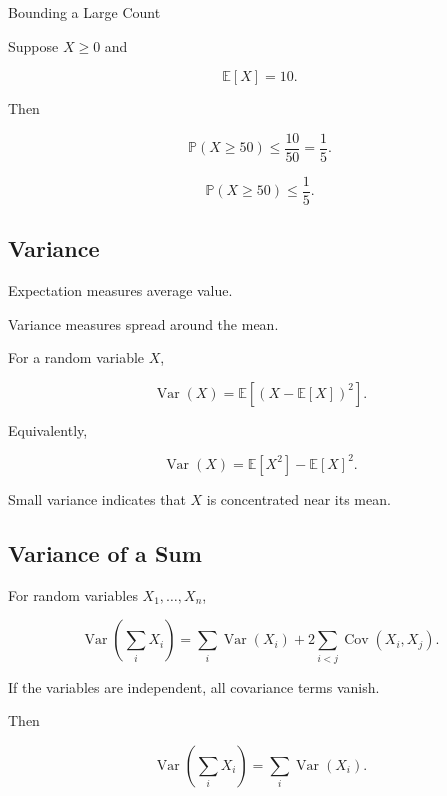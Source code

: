 \begin{workedexamplebox}{Bounding a Large Count}

Suppose \(X\geq0\) and

\[
\mathbb{E}[X]=10.
\]

Then

\[
\mathbb{P}(X\geq50)
\leq
\frac{10}{50}
=
\frac15.
\]

\begin{answerbox}
\[
\boxed{
\mathbb{P}(X\geq50)\leq\frac15.
}
\]
\end{answerbox}

\end{workedexamplebox}

\subsection{Variance}
\label{subsec:variance-probabilistic-combinatorics}

Expectation measures average value.

Variance measures spread around the mean.

For a random variable \(X\),

\[
\boxed{
\operatorname{Var}(X)
=
\mathbb{E}
\left[
(X-\mathbb{E}[X])^2
\right].
}
\]

Equivalently,

\[
\boxed{
\operatorname{Var}(X)
=
\mathbb{E}[X^2]
-
\mathbb{E}[X]^2.
}
\]

Small variance indicates that \(X\) is concentrated near its mean.

\subsection{Variance of a Sum}
\label{subsec:variance-sum}

For random variables \(X_1,\ldots,X_n\),

\[
\operatorname{Var}
\left(
\sum_iX_i
\right)
=
\sum_i\operatorname{Var}(X_i)
+
2\sum_{i<j}
\operatorname{Cov}(X_i,X_j).
\]

If the variables are independent, all covariance terms vanish.

Then

\[
\boxed{
\operatorname{Var}
\left(
\sum_iX_i
\right)
=
\sum_i\operatorname{Var}(X_i).
}
\]

